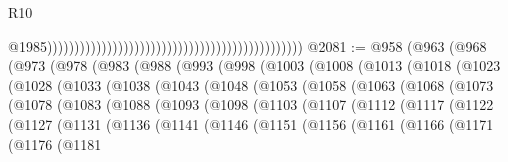 \begin{lexlean}{R10}
\begin{coremodule}
                                                                                                  @1985)))))))))))))))))))))))))))))))))))))))))))))))
@2081 := @958
    (@963
      (@968
        (@973
          (@978
            (@983
              (@988
                (@993
                  (@998
                    (@1003
                      (@1008
                        (@1013
                          (@1018
                            (@1023
                              (@1028
                                (@1033
                                  (@1038
                                    (@1043
                                      (@1048
                                        (@1053
                                          (@1058
                                            (@1063
                                              (@1068
                                                (@1073
                                                  (@1078
                                                    (@1083
                                                      (@1088
                                                        (@1093
                                                          (@1098
                                                            (@1103
                                                              (@1107
                                                                (@1112
                                                                  (@1117
                                                                    (@1122
                                                                      (@1127
                                                                        (@1131
                                                                          (@1136
                                                                            (@1141
                                                                              (@1146
                                                                                (@1151
                                                                                  (@1156
                                                                                    (@1161
                                                                                      (@1166
                                                                                        (@1171
                                                                                          (@1176
                                                                                            (@1181

\end{coremodule}
\end{lexlean}
